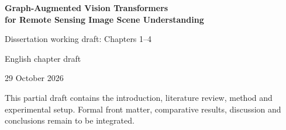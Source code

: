\documentclass[12pt,a4paper]{report}
\numberwithin{equation}{chapter}                          %
\renewcommand{\contentsname}{}
\renewcommand{\cftsecpagefont}{\color{white}}        %
\begin{document}
\onehalfspacing
\setlength{\parindent}{0pt}
\setlength{\parskip}{0.3em}
\setlength{\emergencystretch}{2em}
\renewcommand{\cftsecpagefont}{\normalfont}
\renewcommand{\contentsname}{Contents}
\begin{titlepage}
\centering
\vspace*{2cm}
{\Large\bfseries Graph-Augmented Vision Transformers\\[0.4em]
for Remote Sensing Image Scene Understanding\par}
\vspace{2cm}
{\large Dissertation working draft: Chapters 1--4\par}
\vspace{0.5cm}
{\large English chapter draft\par}
\vfill
29 October 2026\par
\vspace{0.7cm}
{\small This partial draft contains the introduction, literature review,
method and experimental setup. Formal front matter, comparative results,
discussion and conclusions remain to be integrated.}
\end{titlepage}
\tableofcontents
\clearpage
{}
\setcounter{chapter}{0}




\clearpage
\renewcommand{\bibname}{References}


\end{document}
